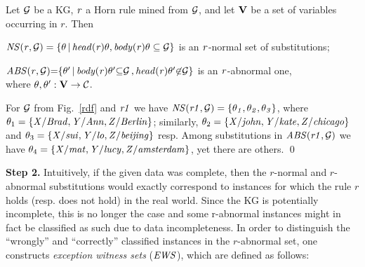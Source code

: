 \begin{definition}\label{sec:rulelearn}
Let $\mathcal{G}$ be a KG, $\mathit{r}$ a Horn rule mined from $\mathcal{G}$, and let ${\mathbf V}$ be a set of variables occurring in $r$. Then
\begin{myitemize}
\item $\mathit{NS(r, \mathcal{G})=\{\theta\, |\, head(r)\theta,body(r)\theta \subseteq \mathcal{G}\}}$ is an $\mathit{r}$-normal set of substitutions;
\item $\mathit{ABS(r, \mathcal{G}){=}\{\theta'\, |\, body(r)\theta' {\subseteq} \mathcal{G}\,{,}\,head(r)\theta' {\not \in} \mathcal{G}\}}$ is an $\mathit{r}$-abnormal one, \\
where $\theta,\theta':{\mathbf V} \rightarrow \mathcal{C}$.
\end{myitemize} 
\end{definition}

\begin{example}\label{ex:abns}
For $\mathcal{G}$ from Fig.~\ref{rdf} and $\mathit{r1}$ 
we have $\mathit{NS(r1,\mathcal{G})}=\{\mathit{\theta_1,\theta_2,\theta_3}\}$, where $\theta_1=\{\mathit{X/Brad,Y/Ann,Z/Berlin}\}$; similarly, $\theta_2=\{\mathit{X/john,Y/kate,Z/chicago}\}$ and $\theta_3=\{\mathit{X/sui,Y/lo,Z/beijing}\}$ resp. Among substitutions in $\mathit{ABS(r1,\mathcal{G})}$ we have $\theta_4=\{\mathit{X/mat,Y/lucy,Z/amsterdam}\}$, yet there are others. \qed 
\end{example}
 


\noindent \textbf{Step 2.} Intuitively, if the given data was complete, then the $r$-normal
and $r$-abnormal substitutions would exactly correspond to instances for which
the rule $r$ holds (resp. does not hold) in the real world. Since the KG is
potentially incomplete, this is no longer the case and some r-abnormal instances
might in fact be classified as such due to data incompleteness.  In order to
distinguish the ``wrongly'' and ``correctly'' classified instances in the
$r$-abnormal set, one constructs \emph{exception witness sets} ($\mathit{EWS}$), which
are defined as follows:



